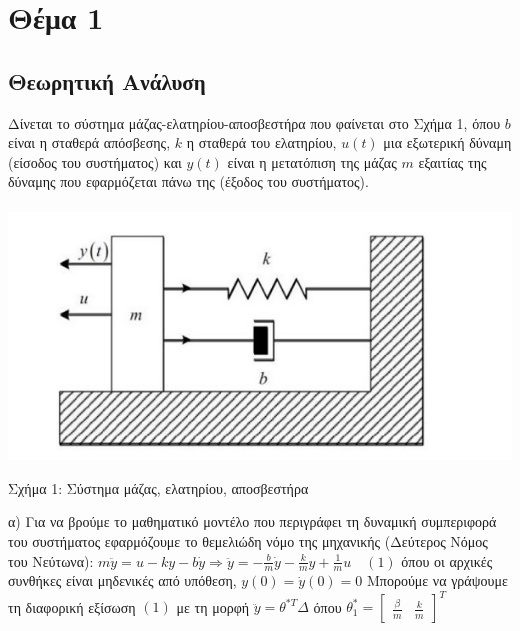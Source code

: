\documentclass[12pt]{article}
\begin{document}
\newpage
\section{Θέμα 1 }
\subsection{Θεωρητική Ανάλυση}
Δίνεται το σύστημα μάζας-ελατηρίου-αποσβεστήρα που φαίνεται στο Σχήμα 1, όπου $b$ είναι η σταθερά απόσβεσης, $k$ η σταθερά του ελατηρίου, $u(t)$ μια εξωτερική δύναμη (είσοδος του συστήματος) και $y(t)$ είναι η μετατόπιση της μάζας  $m$ εξαιτίας της δύναμης που εφαρμόζεται πάνω της (έξοδος του συστήματος).
\\ \\
\includegraphics[width=\linewidth]{sys1.jpg}
\centerline{Σχήμα 1: Σύστημα μάζας, ελατηρίου, αποσβεστήρα}
\newline
\newline
\newline
α) Για να βρούμε το μαθηματικό μοντέλο που περιγράφει τη δυναμική συμπεριφορά του συστήματος εφαρμόζουμε το θεμελιώδη νόμο της μηχανικής (Δεύτερος Νόμος του Νεύτωνα):
\newline
\newline
$m \ddot{y}=u-ky-b\dot{y} \Rightarrow  \ddot{y}=-\frac{b}{m}\dot{y}-\frac{k}{m}y+\frac{1}{m}u \quad \left(1\right)$
\newline
\newline
όπου οι αρχικές συνθήκες είναι μηδενικές από υπόθεση, \quad $y(0)=\dot{y}(0)=0$
\newline
\newline
Μπορούμε να γράψουμε τη διαφορική εξίσωση $\left(1\right)$  με τη μορφή \quad $\ddot{y}=\theta^{*T}\Delta$ \quad όπου
\newline
\newline
$\theta_{1}^{*}=
\begin{bmatrix}
		\frac{β}{m} & \frac{k}{m}
\end{bmatrix}^{T}$
\end{document}
